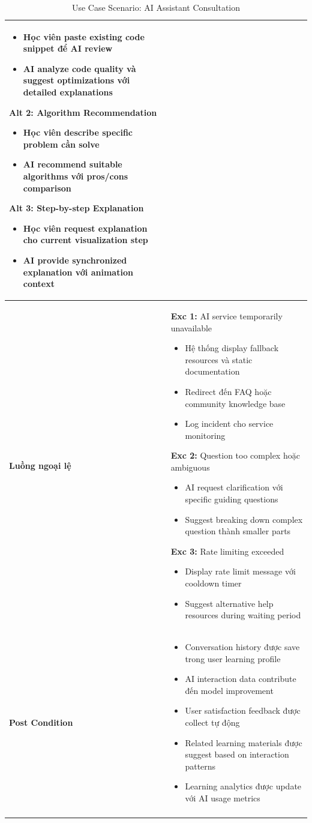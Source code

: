 \begin{longtable}{| p{3cm} | p{10cm} |}
\begin{itemize}
    \item Học viên paste existing code snippet để AI review
    \item AI analyze code quality và suggest optimizations với detailed explanations
\end{itemize}
\textbf{Alt 2:} Algorithm Recommendation
\begin{itemize}
    \item Học viên describe specific problem cần solve
    \item AI recommend suitable algorithms với pros/cons comparison
\end{itemize}
\textbf{Alt 3:} Step-by-step Explanation
\begin{itemize}
    \item Học viên request explanation cho current visualization step
    \item AI provide synchronized explanation với animation context
\end{itemize} \\ \hline
\textbf{Luồng ngoại lệ} & 
\textbf{Exc 1:} AI service temporarily unavailable
\begin{itemize}
    \item Hệ thống display fallback resources và static documentation
    \item Redirect đến FAQ hoặc community knowledge base
    \item Log incident cho service monitoring
\end{itemize}
\textbf{Exc 2:} Question too complex hoặc ambiguous
\begin{itemize}
    \item AI request clarification với specific guiding questions
    \item Suggest breaking down complex question thành smaller parts
\end{itemize}
\textbf{Exc 3:} Rate limiting exceeded
\begin{itemize}
    \item Display rate limit message với cooldown timer
    \item Suggest alternative help resources during waiting period
\end{itemize} \\ \hline
\textbf{Post Condition} & 
\begin{itemize}
    \item Conversation history được save trong user learning profile
    \item AI interaction data contribute đến model improvement
    \item User satisfaction feedback được collect tự động
    \item Related learning materials được suggest based on interaction patterns
    \item Learning analytics được update với AI usage metrics
\end{itemize} \\ \hline
\caption{Use Case Scenario: AI Assistant Consultation}
\label{tab:uc003} \\
\end{longtable}

